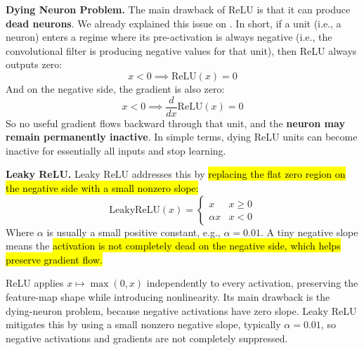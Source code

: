 \highspace
\textcolor{Red2}{ \textbf{Dying Neuron Problem.}} The main drawback of ReLU is that it can produce \textbf{dead neurons}. We already explained this issue on . In short, if a unit (i.e., a neuron) enters a regime where its pre-activation is always negative (i.e., the convolutional filter is producing negative values for that unit), then ReLU always outputs zero:
\begin{equation*}
    x < 0 \implies \mathrm{ReLU}(x) = 0
\end{equation*}
And on the negative side, the gradient is also zero:
\begin{equation*}
    x < 0 \implies \frac{d}{dx} \mathrm{ReLU}(x) = 0
\end{equation*}
So no useful gradient flows backward through that unit, and the \textbf{neuron may remain permanently inactive}. In simple terms, dying ReLU units can become inactive for essentially all inputs and stop learning.

\highspace
\textcolor{Green3}{ \textbf{Leaky ReLU.}} Leaky ReLU addresses this by \hl{replacing the flat zero region on the negative side with a small nonzero slope:}
\begin{equation*}
    \mathrm{LeakyReLU}(x) = \begin{cases}
        x & x \geq 0 \\
        \alpha x & x < 0
    \end{cases}
\end{equation*}
Where $\alpha$ is usually a small positive constant, e.g., $\alpha = 0.01$. A tiny negative slope means the \hl{activation is not completely dead on the negative side, which helps preserve gradient flow.}

\highspace
\begin{takeawaysbox}
    ReLU applies $x \mapsto \max(0, x)$ independently to every activation, preserving the feature-map shape while introducing nonlinearity. Its main drawback is the dying-neuron problem, because negative activations have zero slope. Leaky ReLU mitigates this by using a small nonzero negative slope, typically $\alpha = 0.01$, so negative activations and gradients are not completely suppressed.
\end{takeawaysbox}
